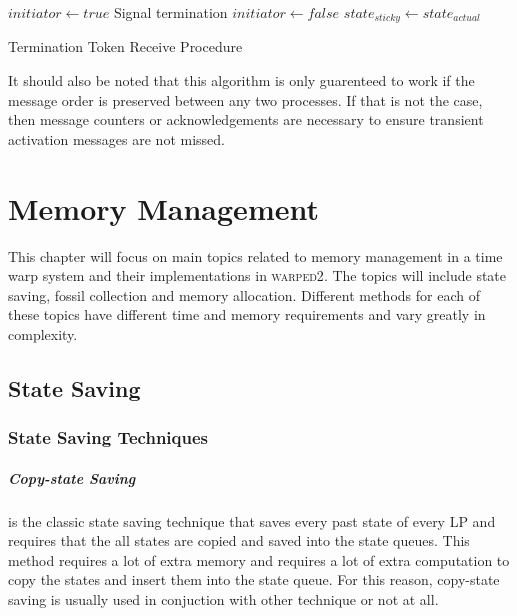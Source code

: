 \documentclass[11pt]{book}
\begin{document}
\begin{algorithm}
\DontPrintSemicolon
\SetAlgoVlined
{}
    $initiator \gets true$\;
     {
         {
            Signal termination\;
        }
    }  {
        $initiator \gets false$\;
        \;
    }
    $state_{sticky} \gets state_{actual}$\;
\caption{Termination Token Receive Procedure}\label{termination_token_receive}
\end{algorithm}

It should also be noted that this algorithm is only guarenteed to work if the message order
is preserved between any two processes. If that is not the case, then message counters or
acknowledgements are necessary to ensure transient activation messages are not missed.



\chapter{Memory Management}\label{memory_management}

This chapter will focus on main topics related to memory management in a time warp system
and their implementations in \textsc{warped2}. The topics will include state saving, fossil
collection and memory allocation. Different methods for each of these topics have different
time and memory requirements and vary greatly in complexity.

\section{State Saving}

\subsection{State Saving Techniques}

\paragraph{Copy-state Saving} is the classic state saving technique that saves every past
state of every LP and requires that the all states are copied and saved into the state queues.
This method requires a lot of extra memory and requires a lot of extra computation to copy
the states and insert them into the state queue. For this reason, copy-state saving is
usually used in conjuction with other technique or not at all.
\end{document}
